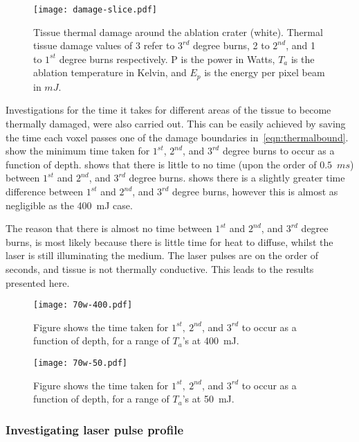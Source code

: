 \begin{figure}[!htbp]
	\centering
	\texttt{[image: damage-slice.pdf]}
	\caption{Tissue thermal damage around the ablation crater (white). Thermal tissue damage values of 3 refer to $3^{rd}$ degree burns, 2 to $2^{nd}$, and 1 to $1^{st}$ degree burns respectively. P is the power in Watts, $T_a$ is the ablation temperature in Kelvin, and $E_p$ is the energy per pixel beam in $mJ$.}
	\label{fig:damfig}
\end{figure}

Investigations for the time it takes for different areas of the tissue to become thermally damaged, were also carried out. This can be easily achieved by saving the time each voxel passes one of the damage boundaries in~\cref{eqn:thermalbound}.~ show the minimum time taken for $1^{st}$, $2^{nd}$, and $3^{rd}$ degree burns to occur as a function of depth.  shows that there is little to no time (upon the order of $0.5$~$ms$) between $1^{st}$ and $2^{nd}$, and $3^{rd}$ degree burns.
 shows there is a slightly greater time difference between $1^{st}$ and $2^{nd}$, and $3^{rd}$ degree burns, however this is almost as negligible as the 400~mJ case.

The reason that there is almost no time between $1^{st}$ and $2^{nd}$, and $3^{rd}$ degree burns, is most likely because there is little time for heat to diffuse, whilst the laser is still illuminating the medium. The laser pulses are on the order of seconds, and tissue is not thermally conductive. This leads to the results presented here.


\begin{figure}[!htbp]
	\centering
	\texttt{[image: 70w-400.pdf]}
	\caption{Figure shows the time taken for $1^{st},\ 2^{nd}$, and $3^{rd}$ to occur as a function of depth, for a range of $T_a$'s at 400~mJ.}
	\label{fig:time-thres1}
\end{figure}	
	\FloatBarrier

\begin{figure}[!htbp]

	\centering
	\texttt{[image: 70w-50.pdf]}
	\caption{Figure shows the time taken for $1^{st},\ 2^{nd}$, and $3^{rd}$ to occur as a function of depth, for a range of $T_a$'s at 50~mJ.}
	\label{fig:time-thres2}
\end{figure}	
\subsubsection*{Investigating laser pulse profile}

